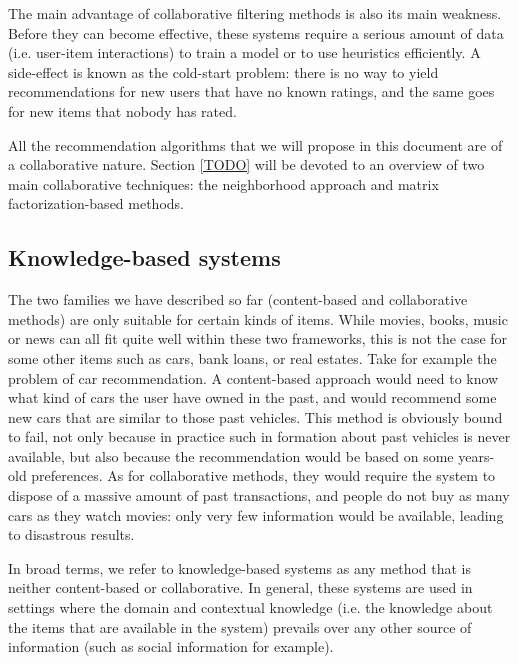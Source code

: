 The main advantage of collaborative filtering methods is also its main
weakness. Before they can become effective, these systems require a serious
amount of data (i.e. user-item interactions) to train a model or to use
heuristics efficiently. A side-effect is known as the cold-start problem: there
is no way to yield recommendations for new users that have no known ratings,
and the same goes for new items that nobody has rated.

All the recommendation algorithms that we will propose in this document are of
a collaborative nature. Section \ref{TODO} will be devoted to an overview of
two main collaborative techniques: the neighborhood approach and matrix
factorization-based methods.

\subsection{Knowledge-based systems}

The two families we have described so far (content-based and collaborative
methods) are only suitable for certain kinds of items. While movies, books,
music or news can all fit quite well within these two frameworks, this is not
the case for some other items such as cars, bank loans, or real estates. Take
for example the problem of car recommendation. A content-based approach would
need to know what kind of cars the user have owned in the past, and would
recommend some new cars that are similar to those past vehicles. This method is
obviously bound to fail, not only because in practice such in formation about
past vehicles is never available, but also because the recommendation would be
based on some years-old preferences. As for collaborative methods, they would
require the system to dispose of a massive amount of past transactions, and
people do not buy as many cars as they watch movies: only very few information
would be available, leading to disastrous results.

In broad terms, we refer to knowledge-based systems as any method that is
neither content-based or collaborative. In general, these systems are used in
settings where the domain and contextual knowledge (i.e. the knowledge about the
items that are available in the system) prevails over any other source of
information (such as social information for example).

